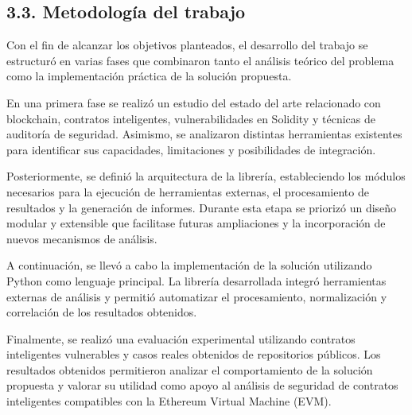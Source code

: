 \subsection{3.3. Metodología del
trabajo}\label{metodologuxeda-del-trabajo}

Con el fin de alcanzar los objetivos planteados, el desarrollo del
trabajo se estructuró en varias fases que combinaron tanto el análisis
teórico del problema como la implementación práctica de la solución
propuesta.

En una primera fase se realizó un estudio del estado del arte
relacionado con blockchain, contratos inteligentes, vulnerabilidades en
Solidity y técnicas de auditoría de seguridad. Asimismo, se analizaron
distintas herramientas existentes para identificar sus capacidades,
limitaciones y posibilidades de integración.

Posteriormente, se definió la arquitectura de la librería, estableciendo
los módulos necesarios para la ejecución de herramientas externas, el
procesamiento de resultados y la generación de informes. Durante esta
etapa se priorizó un diseño modular y extensible que facilitase futuras
ampliaciones y la incorporación de nuevos mecanismos de análisis.

A continuación, se llevó a cabo la implementación de la solución
utilizando Python como lenguaje principal. La librería desarrollada
integró herramientas externas de análisis y permitió automatizar el
procesamiento, normalización y correlación de los resultados obtenidos.

Finalmente, se realizó una evaluación experimental utilizando contratos
inteligentes vulnerables y casos reales obtenidos de repositorios
públicos. Los resultados obtenidos permitieron analizar el
comportamiento de la solución propuesta y valorar su utilidad como apoyo
al análisis de seguridad de contratos inteligentes compatibles con la
Ethereum Virtual Machine (EVM).
